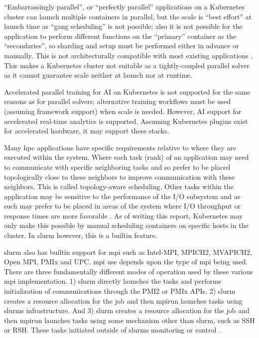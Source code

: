 \documentclass[conference]{IEEEtran}
\begin{document}
``Embarrassingly parallel'', or ``perfectly parallel'' applications on a Kubernetes cluster can launch multiple containers in parallel, but the scale is ``best effort'' at launch time as ``gang scheduling'' is not possible; also it is not possible for the application to perform different functions on the ``primary'' container as the ``secondaries'', so sharding and setup must be performed either in advance or manually. This is not architecturally compatible with most existing applications \cite{hpc-on-kubernetes}. This makes a Kubernetes cluster not suitable as a tightly-coupled parallel solver as it cannot guarantee scale neither at launch nor at runtime.

Accelerated parallel training for AI on Kubernetes is not supported for the same reasons as for parallel solvers; alternative training workflows must be used (assuming framework support) when scale is needed. However, AI support for accelerated real-time analytics is supported. Assuming Kubernetes plugins exist for accelerated hardware, it may support these stacks.

Many \gls{hpc} applications have specific requirements relative to where they are executed within the system. Where each task (rank) of an application may need to communicate with specific neighboring tasks and so prefer to be placed topologically close to these neighbors to improve communication with these neighbors. This is called topology-aware scheduling. Other tasks within the application may be sensitive to the performance of the I/O subsystem and as such may prefer to be placed in areas of the system where I/O throughput or response times are more favorable \cite{stackhpc-kubernetes-mpi}. As of writing this report, Kubernetes may only make this possible by manual scheduling containers on specific hosts in the cluster. In \gls{slurm} however, this is a builtin feature.

\gls{slurm} also has builtin support for \gls{mpi} such as Intel-MPI, MPICH2, MVAPICH2, Open MPI, PMIx and UPC. \gls{mpi} use depends upon the type of \gls{mpi} being used. There are three fundamentally different modes of operation used by these various \gls{mpi} implementation. 1) \gls{slurm} directly launches the tasks and performs initialization of communications through the PMI2 or PMIx APIs. 2) \gls{slurm} creates a resource allocation for the job and then mpirun launches tasks using \gls{slurm}s infrastructure. And 3) \gls{slurm} creates a resource allocation for the job and then mpirun launches tasks using some mechanism other than \gls{slurm}, such as SSH or RSH. These tasks initiated outside of \gls{slurm}s monitoring or control \cite{slurm-pmi}.
\end{document}
